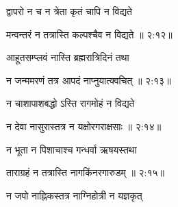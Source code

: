 {\devanagarifont द्वापरो न च न त्रेता कृतं चापि न विद्यते \thinspace{\dandab} \dontdisplaylinenum }%


{\devanagarifont मन्वन्तरं न तत्रास्ति कल्पश्चैव न विद्यते {॥ २:१२॥} \veg\dontdisplaylinenum }%

{\devanagarifont आहूतसम्प्लवं नास्ति ब्रह्मरात्रिदिनं तथा \thinspace{\dandab} \dontdisplaylinenum }%


{\devanagarifont न जन्ममरणं तत्र आपदं नाप्नुयात्क्वचित् {॥ २:१३॥} \veg\dontdisplaylinenum }%

{\devanagarifont न चाशापाशबद्धो ऽस्ति रागमोहं न विद्यते \thinspace{\dandab} \dontdisplaylinenum }%


{\devanagarifont न देवा नासुरास्तत्र न यक्षोरगराक्षसाः {॥ २:१४॥} \veg\dontdisplaylinenum }%

{\devanagarifont न भूता न पिशाचाश्च गन्धर्वा ऋषयस्तथा \thinspace{\dandab} \dontdisplaylinenum }%


{\devanagarifont ताराग्रहं न तत्रास्ति नागकिंनरगारुडम् {॥ २:१५॥} \veg\dontdisplaylinenum }%
 
{\devanagarifont न जपो नाह्निकस्तत्र नाग्निहोत्री न यज्ञकृत् \thinspace{\dandab} \dontdisplaylinenum }%

